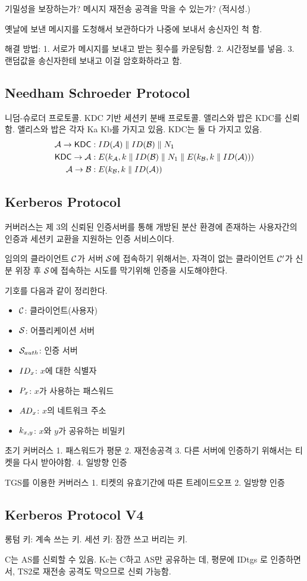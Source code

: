 기밀성을 보장하는가? 메시지 재전송 공격을 막을 수 있는가? (적시성.)

옛날에 보낸 메시지를 도청해서 보관하다가 나중에 보내서 송신자인 척 함.

해결 방법: 
1. 서로가 메시지를 보내고 받는 횟수를 카운팅함.
2. 시간정보를 넣음.
3. 랜덤값을 송신자한테 보내고 이걸 암호화하라고 함.

\subsection{Needham Schroeder Protocol}

니덤-슈로더 프로토콜. KDC 기반 세션키 분배 프로토콜. 앨리스와 밥은 KDC를 신뢰함.
앨리스와 밥은 각자 Ka Kb를 가지고 있음. KDC는 둘 다 가지고 있음.
\begin{equation}
  \begin{split}
    \mathcal{A} \to \textsf{KDC} &: ID(\mathcal{A}) \parallel ID(\mathcal{B}) \parallel N_1 \\ 
    \textsf{KDC} \to \mathcal{A} &: E(k_{\mathcal{A}}, 
    k \parallel ID(\mathcal{B}) \parallel N_1 \parallel 
    E(k_{\mathcal{B}}, k \parallel ID(\mathcal{A}))) \\
    \mathcal{A} \to \mathcal{B} &: E(k_{\mathcal{B}}, k \parallel ID(\mathcal{A}))
  \end{split}
\end{equation}

\newpage
\subsection{Kerberos Protocol}

커버러스는 제 3의 신뢰된 인증서버를 통해 개방된 분산 환경에 존재하는 사용자간의
인증과 세션키 교환을 지원하는 인증 서비스이다.

임의의 클라이언트 $\mathcal{C}$가 서버 $\mathcal{S}$에 접속하기 위해서는, 
자격이 없는 클라이언트 $\mathcal{C}'$가 신분 위장 후 $\mathcal{S}$에 접속하는 시도를 막기위해
인증을 시도해야한다.

기호를 다음과 같이 정리한다.
\begin{itemize}
  \item $\mathcal{C}$: 클라이언트(사용자)
  \item $\mathcal{S}$: 어플리케이션 서버
  \item $\mathcal{S}_{auth}$: 인증 서버
  \item $ID_x$: $x$에 대한 식별자
  \item $P_x$: $x$가 사용하는 패스워드
  \item $AD_x$: $x$의 네트워크 주소
  \item $k_{x, y}$: $x$와 $y$가 공유하는 비밀키
\end{itemize}

초기 커버러스
1. 패스워드가 평문
2. 재전송공격
3. 다른 서버에 인증하기 위해서는 티켓을 다시 받아야함.
4. 일방향 인증

TGS를 이용한 커버러스
1. 티켓의 유효기간에 따른 트레이드오프
2. 일방향 인증

\subsection{Kerberos Protocol V4}

롱텀 키: 계속 쓰는 키.
세션 키: 잠깐 쓰고 버리는 키.

C는 AS를 신뢰할 수 있음. Kc는 C하고 AS만 공유하는 데, 평문에 IDtgs 로
인증하면서, TS2로 재전송 공격도 막으므로 신뢰 가능함.

